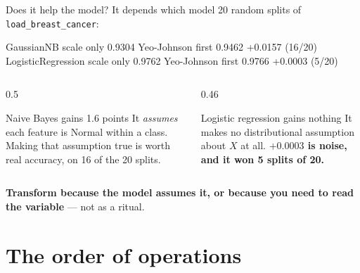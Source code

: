 \documentclass[aspectratio=169]{beamer}
\begin{document}
\begin{frame}[fragile,shrink=4]{Does it help the model? It depends which model}
20 random splits of \texttt{load\_breast\_cancer}:
\begin{outblk}
  GaussianNB           scale only 0.9304   Yeo-Johnson first 0.9462   +0.0157  (16/20)
  LogisticRegression   scale only 0.9762   Yeo-Johnson first 0.9766   +0.0003  (5/20)
\end{outblk}
\begin{columns}[T]
  \begin{column}{0.5\textwidth}
    \begin{exampleblock}{Naive Bayes gains 1.6 points}
      \small It \emph{assumes} each feature is Normal within a class. Making
      that assumption true is worth real accuracy, on 16 of the 20 splits.
    \end{exampleblock}
  \end{column}
  \begin{column}{0.46\textwidth}
    \begin{alertblock}{Logistic regression gains nothing}
      \small It makes no distributional assumption about $X$ at all.
      \textbf{$+0.0003$ is noise, and it won 5 splits of 20.}
    \end{alertblock}
  \end{column}
\end{columns}
\begin{center}\small
  \textbf{Transform because the model assumes it, or because you need to read
  the variable} --- not as a ritual.
\end{center}
\end{frame}

\section[Order]{The order of operations}
\label{sec:leak}
\end{document}

